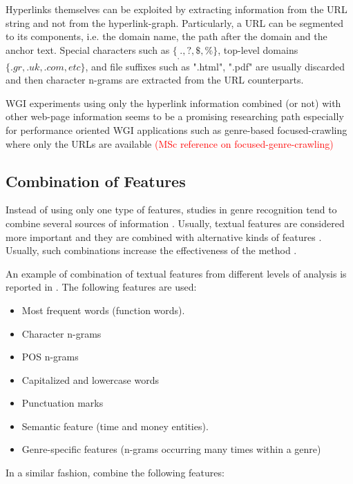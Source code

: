 Hyperlinks themselves can be exploited by extracting information from the URL string and not from the hyperlink-graph. Particularly, a URL can be segmented to its components, i.e. the domain name, the path after the domain and the anchor text. Special characters such as $\{_ , . , ?, \$ , \%\}$, top-level domains $\{.gr , .uk , .com, etc\}$, and file suffixes such as ".html", ".pdf" are usually discarded and then character n-grams are extracted from the URL counterparts. 

WGI experiments using only the hyperlink information combined (or not) with other web-page information seems to be a promising researching path especially for performance oriented WGI applications such as genre-based focused-crawling where only the URLs are available \parencite{jebari2014pureURL,jebari2015combination,abramson2012_URL,priyatam2013don_URL} 
\textcolor{red}{(MSc reference on focused-genre-crawling)}

\subsection{Combination of Features}

Instead of using only one type of features, studies in genre recognition tend to combine several sources of information . Usually, textual features are considered more important and they are combined with alternative kinds of features . Usually, such combinations increase the effectiveness of the method .

An example of combination of textual features from different levels of analysis is reported in \parencite{onan2018ensemble}. The following features are used:

\begin{itemize}
\item Most frequent words (function words). 
\item Character n-grams
\item POS n-grams
\item Capitalized and lowercase words
\item Punctuation marks 
\item Semantic feature (time and money entities).
\item Genre-specific features (n-grams occurring many times within a genre)
\end{itemize}

In a similar fashion, \parencite{waltinger2010feature} combine the following features:

